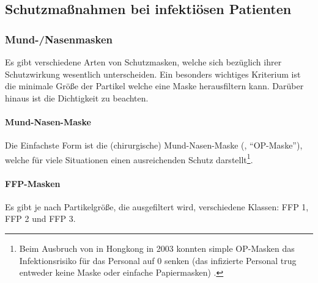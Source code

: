 \subsection{Schutzmaßnahmen bei infektiösen Patienten}

\subsubsection{Mund-/Nasenmasken}

Es gibt verschiedene Arten von Schutzmasken, welche sich bezüglich ihrer
Schutzwirkung wesentlich unterscheiden. Ein besonders wichtiges Kriterium ist 
die minimale Größe der Partikel welche eine Maske herausfiltern kann. Darüber
hinaus ist die Dichtigkeit zu beachten. 

\paragraph{Mund-Nasen-Maske} 
Die Einfachste Form ist die (chirurgische) Mund-Nasen-Maske (,
"`OP-Maske"'), welche für viele Situationen einen ausreichenden Schutz
darstellt\footnote{Beim Ausbruch von  in Hongkong in 2003 konnten
simple OP-Masken das Infektionsrisiko für das Personal auf 0 senken (das infizierte
Personal trug entweder keine Maske oder einfache Papiermasken)
\cite{Seto2003}.}.

\paragraph{FFP-Masken} Es gibt je nach Partikelgröße, die ausgefiltert wird,
verschiedene Klassen: FFP 1, FFP 2 und FFP 3. 
{}


